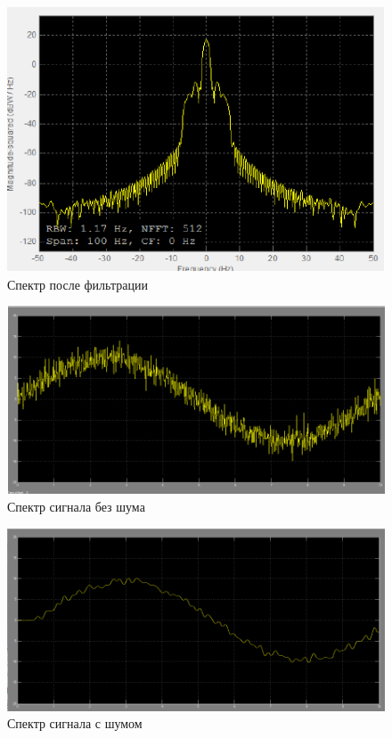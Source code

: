 \documentclass[a4paper, 12pt]{article}
\begin{document}
\begin{figure}[H]
   \includegraphics[scale=0.7]{lab6/7.png}
   \caption{Спектр после фильтрации}
\end{figure}
\begin{figure}[H]
   \includegraphics[scale=0.7]{lab6/8.png}
   \caption{Спектр сигнала без шума}
\end{figure}

\begin{figure}[H]
   \includegraphics[scale=0.7]{lab6/9.png}
   \caption{Спектр сигнала с шумом}
\end{figure}
\end{document}
